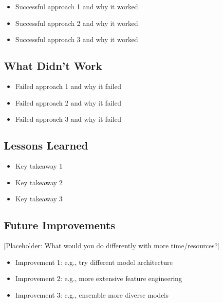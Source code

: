 \documentclass{article}
\begin{document}
\begin{itemize}
    \item Successful approach 1 and why it worked
    \item Successful approach 2 and why it worked
    \item Successful approach 3 and why it worked
\end{itemize}

\subsection{What Didn't Work}

\begin{itemize}
    \item Failed approach 1 and why it failed
    \item Failed approach 2 and why it failed
    \item Failed approach 3 and why it failed
\end{itemize}

\subsection{Lessons Learned}

\begin{itemize}
    \item Key takeaway 1
    \item Key takeaway 2
    \item Key takeaway 3
\end{itemize}

\subsection{Future Improvements}

[Placeholder: What would you do differently with more time/resources?]

\begin{itemize}
    \item Improvement 1: e.g., try different model architecture
    \item Improvement 2: e.g., more extensive feature engineering
    \item Improvement 3: e.g., ensemble more diverse models
\end{itemize}
\end{document}
